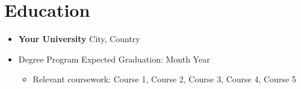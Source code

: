 \section*{Education}
\begin{itemize}
    \item[] \textbf{Your University} \hfill City, Country
    \item[] Degree Program \hfill Expected Graduation: Month Year
    \begin{itemize}
        \item Relevant coursework: Course 1, Course 2, Course 3, Course 4, Course 5
    \end{itemize}
\end{itemize}
\sectionspace 